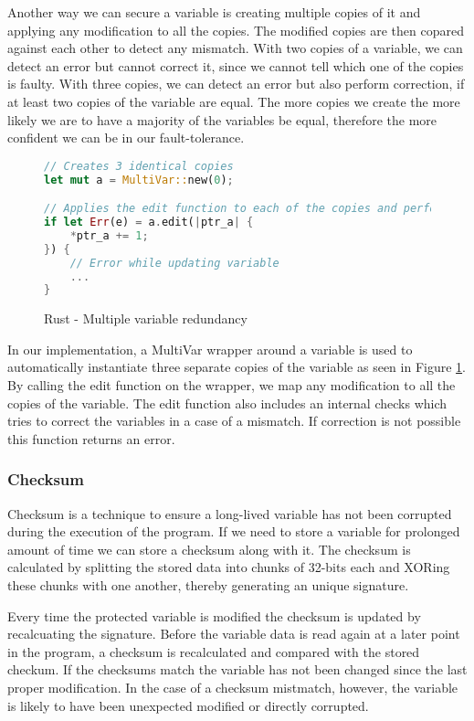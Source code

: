 Another way we can secure a variable is creating multiple copies of it and applying any modification to all the copies. The modified copies are then copared against each other to detect any mismatch. With two copies of a variable, we can detect an error but cannot correct it, since we cannot tell which one of the copies is faulty. With three copies, we can detect an error but also perform correction, if at least two copies of the variable are equal. The more copies we create the more likely we are to have a majority of the variables be equal, therefore the more confident we can be in our fault-tolerance.

\begin{figure}[!h]
\begin{lstlisting}[language=Rust]
// Creates 3 identical copies
let mut a = MultiVar::new(0);

// Applies the edit function to each of the copies and performs equality check
if let Err(e) = a.edit(|ptr_a| {
    *ptr_a += 1;
}) {
    // Error while updating variable
    ...
}
\end{lstlisting}
\caption{Rust - Multiple variable redundancy}
\label{fig:multivar}
\end{figure}

In our implementation, a MultiVar wrapper around a variable is used to automatically instantiate three separate copies of the variable as seen in Figure \ref{fig:multivar}. By calling the edit function on the wrapper, we map any modification to all the copies of the variable. The edit function also includes an internal checks which tries to correct the variables in a case of a mismatch. If correction is not possible this function returns an error.

\subsubsection{Checksum} \label{sec:checksum}

Checksum is a technique to ensure a long-lived variable has not been corrupted during the execution of the program. If we need to store a variable for prolonged amount of time we can store a checksum along with it. The checksum is calculated by splitting the stored data into chunks of 32-bits each and XORing these chunks with one another, thereby generating an unique signature.

Every time the protected variable is modified the checksum is updated by recalcuating the signature. Before the variable data is read again at a later point in the program, a checksum is recalculated and compared with the stored checkum. If the checksums match the variable has not been changed since the last proper modification. In the case of a checksum mistmatch, however, the variable is likely to have been unexpected modified or directly corrupted.

